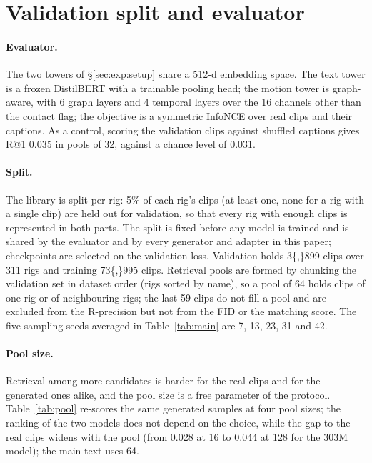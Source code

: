 \section{Validation split and evaluator}\label{app:split}

\paragraph{Evaluator.} The two towers of \S\ref{sec:exp:setup} share a 512-d embedding space. The text tower
is a frozen DistilBERT with a trainable pooling head; the motion tower is graph-aware, with 6 graph layers and 4
temporal layers over the 16 \rep{} channels other than the contact flag; the objective is a symmetric InfoNCE
over real clips and their captions. As a control, scoring the validation clips against shuffled captions gives
R@1 \num{0.035} in pools of 32, against a chance level of \num{0.031}.

\paragraph{Split.} The library is split per rig: \num{5}\% of each rig's clips (at least one, none for a rig with a
single clip) are held out for validation, so that every rig with enough clips is represented in both
parts. The split is fixed before any model is trained and is shared by
the evaluator and by every generator and adapter in this paper; checkpoints are selected on the
validation loss. Validation holds \num{3{,}899} clips over \num{311} rigs and training
\num{73{,}995} clips. Retrieval pools are formed by chunking the validation set in dataset order
(rigs sorted by name), so a pool of 64 holds clips of one rig or of neighbouring rigs; the last
59 clips do not fill a pool and are excluded from the R-precision but not from the FID or the
matching score. The five sampling seeds averaged in Table~\ref{tab:main} are 7, 13, 23, 31 and 42.

\paragraph{Pool size.} Retrieval among more candidates is harder for the real clips and for the
generated ones alike, and the pool size is a free parameter of the protocol. Table~\ref{tab:pool}
re-scores the same generated samples at four pool sizes; the ranking of the two models does not depend on
the choice, while the gap to the real clips widens with the pool (from \num{0.028} at 16 to \num{0.044} at 128 for
the \num{303}M model); the main text uses 64.

